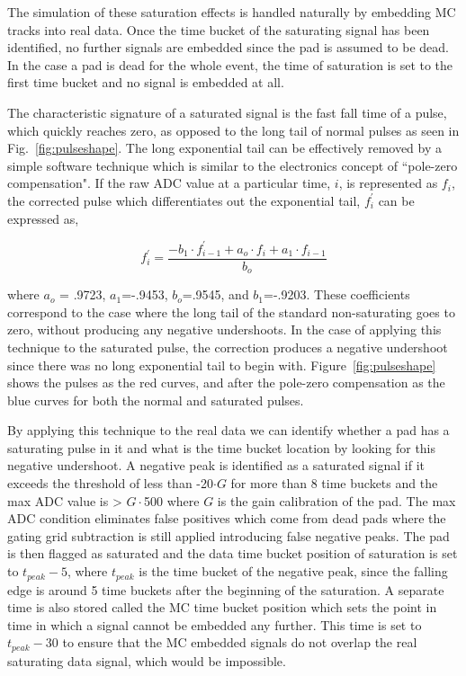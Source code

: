 The simulation of these saturation effects is handled naturally by embedding MC tracks into real data. Once the time bucket of the saturating signal has been identified, no further signals are embedded since the pad is assumed to be dead. In the case a pad is dead for the whole event, the time of saturation is set to the first time bucket and no signal is embedded at all. 

The characteristic signature of a saturated signal is the fast fall time of a pulse, which quickly reaches zero, as opposed to the long tail of normal pulses as seen in Fig.~\ref{fig:pulseshape}. The long exponential tail can be effectively removed by a simple software technique which is similar to the electronics concept of ``pole-zero compensation". If the raw ADC value at a particular time, $i$, is represented as $f_i$, the corrected pulse which differentiates out the exponential tail, $f_i^{'}$ can be expressed as, 

\begin{equation}
f_i^{'} = \frac{-b_1\cdot f_{i-1}^{'} + a_o\cdot f_i + a_1 \cdot f_{i-1}}{b_o}
\label{eq:satpolez}
\end{equation}

where $a_o$ = .9723, $a_1$=-.9453, $b_o$=.9545, and $b_1$=-.9203. These coefficients correspond to the case where the long tail of the standard non-saturating goes to zero, without producing any negative undershoots. In the case of applying this technique to the saturated pulse, the correction produces a negative undershoot since there was no long exponential tail to begin with. Figure~\ref{fig:pulseshape} shows the pulses as the red curves, and after the pole-zero compensation as the blue curves for both the normal and saturated pulses. 

By applying this technique to the real data we can identify whether a pad has a saturating pulse in it and what is the time bucket location by looking for this negative undershoot. A negative peak is identified as a saturated signal if it exceeds the threshold of less than -20$\cdot G$ for more than 8 time buckets and the max ADC value is > $G\cdot$500 where $G$ is the gain calibration of the pad. The max ADC condition eliminates false positives which come from  dead pads where the gating grid subtraction is still applied introducing false negative peaks. The pad is then flagged as saturated and the data time bucket position of saturation is set to $t_{peak} - 5$, where $t_{peak}$ is the time bucket of the negative peak, since the falling edge is around 5 time buckets after the beginning of the saturation. A separate time is also stored called the MC time bucket position which sets the point in time in which a signal cannot be embedded any further. This time is set to $t_{peak} - 30$ to ensure that the MC embedded signals do not overlap the real saturating data signal, which would be impossible. 

